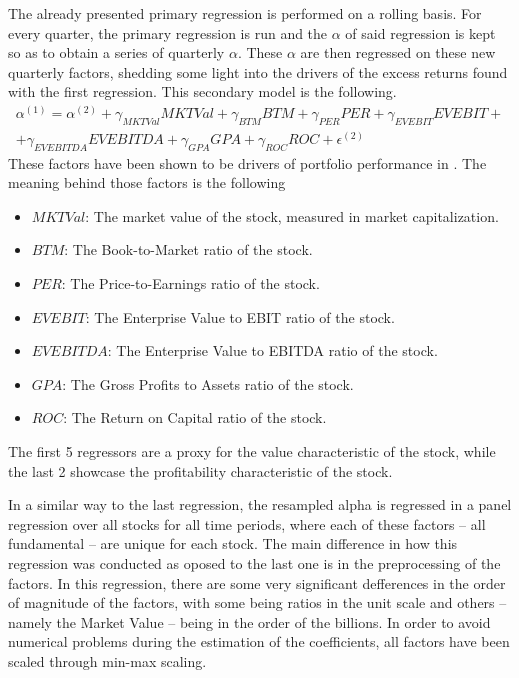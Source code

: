 The already presented primary regression is performed on a rolling basis. For every quarter, the primary regression is run and the $\alpha$ of said regression is kept so as to obtain a series of quarterly $\alpha$. These $\alpha$ are then regressed on these new quarterly factors, shedding some light into the drivers of the excess returns found with the first regression. This secondary model is the following.
\begin{multline}
    \label{eq:secondary-regression}
    \alpha^{(1)}=\alpha^{(2)} + \gamma_{MKTVal}MKTVal + \gamma_{BTM}BTM + \gamma_{PER}PER + \gamma_{EVEBIT}EVEBIT + \\ + \gamma_{EVEBITDA}EVEBITDA + \gamma_{GPA}GPA + \gamma_{ROC}ROC + \epsilon^{(2)}
\end{multline}
These factors have been shown to be drivers of portfolio performance in \cite{ramon_bermejo_climent_2021}. The meaning behind those factors is the following
\begin{itemize}
    \item $MKTVal$: The market value of the stock, measured in market capitalization.
    \item $BTM$: The Book-to-Market ratio of the stock.
    \item $PER$: The Price-to-Earnings ratio of the stock.
    \item $EVEBIT$: The Enterprise Value to EBIT ratio of the stock. 
    \item $EVEBITDA$: The Enterprise Value to EBITDA ratio of the stock.
    \item $GPA$: The Gross Profits to Assets ratio of the stock.
    \item $ROC$: The Return on Capital ratio of the stock. 
\end{itemize}
The first 5 regressors are a proxy for the value characteristic of the stock, while the last 2 showcase the profitability characteristic of the stock. 

In a similar way to the last regression, the resampled alpha is regressed in a panel regression over all stocks for all time periods, where each of these factors -- all fundamental -- are unique for each stock. The main difference in how this regression was conducted as oposed to the last one is in the preprocessing of the factors. In this regression, there are some very significant defferences in the order of magnitude of the factors, with some being ratios in the unit scale and others -- namely the Market Value -- being in the order of the billions. In order to avoid numerical problems during the estimation of the coefficients, all factors have been scaled through min-max scaling.